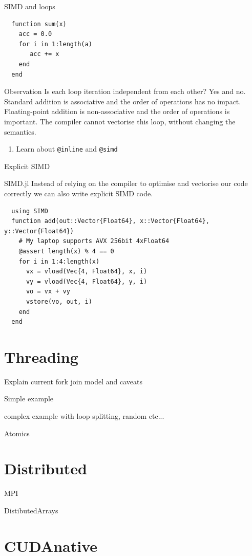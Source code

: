 \documentclass{beamer}
\begin{document}
\begin{frame}[fragile]{SIMD and loops}
  \begin{lstlisting}
  function sum(x)
    acc = 0.0
    for i in 1:length(a)
       acc += x
    end
  end
  \end{lstlisting}
  \begin{block}{Observation}
    Is each loop iteration independent from each other? Yes and no.
    Standard addition is associative and the order of operations has no impact.
    Floating-point addition is non-associative and the order of operations is important.
    The compiler cannot vectorise this loop, without changing the semantics.
  \end{block}
  \begin{enumerate}
    \item Learn about \lstinline{@inline} and \lstinline{@simd}
  \end{enumerate}
\end{frame}
\begin{frame}[fragile]{Explicit SIMD}
  \begin{block}{SIMD.jl}
    Instead of relying on the compiler to optimise and vectorise our code correctly we can also write explicit SIMD code.
  \end{block}
  \begin{lstlisting}
  using SIMD
  function add(out::Vector{Float64}, x::Vector{Float64}, y::Vector{Float64})
    # My laptop supports AVX 256bit 4xFloat64
    @assert length(x) % 4 == 0
    for i in 1:4:length(x)
      vx = vload(Vec{4, Float64}, x, i)
      vy = vload(Vec{4, Float64}, y, i)
      vo = vx + vy
      vstore(vo, out, i)
    end
  end
  \end{lstlisting}
\end{frame}
\section{Threading}
\begin{frame}
  Explain current fork join model and caveats
\end{frame}
\begin{frame}
  Simple example
\end{frame}
\begin{frame}
  complex example with loop splitting, random etc...
\end{frame}
\begin{frame}
  Atomics
\end{frame}
\section{Distributed}
\begin{frame}
  MPI
\end{frame}
\begin{frame}
  DistibutedArrays
\end{frame}
\section{CUDAnative}
\end{document}
